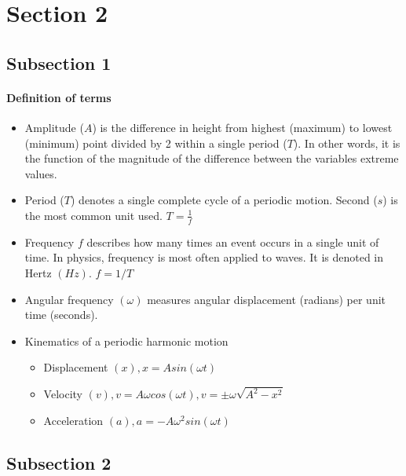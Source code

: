 \documentclass[12pt,a4paper]{article}
\begin{document}
\section{Section 2}
\subsection{Subsection 1}
\paragraph{Definition of terms}
\begin{itemize}
\item Amplitude ($A$) is the difference in height from highest (maximum) to lowest (minimum) point divided by 2 within a single period ($T$). In other words, it is the function of the magnitude of the difference between the variables extreme values.
\item Period ($T$) denotes a single complete cycle of a periodic motion. Second ($s$) is the most common unit used.  $T = \frac{1}{f}$
\item Frequency $f$ describes how many times an event occurs in a single unit of time. In physics, frequency is most often applied to waves. It is denoted in Hertz $(Hz)$.  $f = 1/T$
\item Angular frequency $(\omega)$ measures angular displacement (radians) per unit time (seconds).
\item Kinematics of a periodic harmonic motion
	\begin{itemize}
	\item Displacement $(x), x = A sin(\omega t)$
	\item Velocity $(v), v = A\omega cos(\omega t), v = \pm \omega \sqrt{A^2-x^2}$
	\item Acceleration $(a), a = -A\omega^2 sin(\omega t)$
	\end{itemize}
\end{itemize}

\subsection{Subsection 2}
\blindtext
\end{document}
